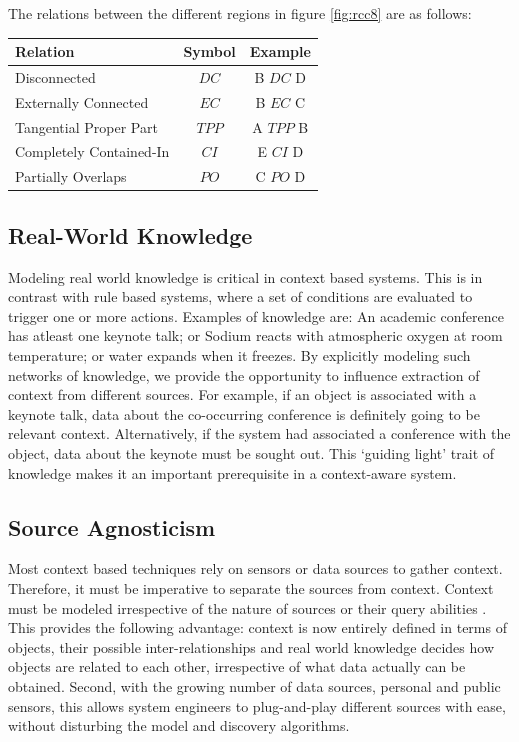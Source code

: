 The relations between the different regions in figure \ref{fig:rcc8} are as follows:
\begin{center}
    \begin{tabular}{ | l | c | c |}
    \hline
    \textbf{Relation} & \textbf{Symbol} & \textbf{Example} \\ \hline
    Disconnected & $DC$ & B $DC$ D \\ \hline
    Externally Connected & $EC$ & B $EC$ C \\ \hline
    Tangential Proper Part & $TPP$ & A $TPP$ B \\ \hline
    Completely Contained-In & $CI$ & E $CI$ D \\ \hline
    Partially Overlaps & $PO$ & C $PO$ D \\ \hline
    \end{tabular}
\end{center}

\subsection{Real-World Knowledge}
Modeling real world knowledge is critical in context based systems. This is in contrast with rule based systems, where a set of conditions are evaluated to trigger one or more actions. Examples of knowledge are: An academic conference has atleast one keynote talk; or Sodium reacts with atmospheric oxygen at room temperature; or water expands when it freezes. By explicitly modeling such networks of knowledge, we provide the opportunity to influence extraction of context from different sources. For example, if an object is associated with a keynote talk, data about the co-occurring conference is definitely going to be relevant context. Alternatively, if the system had associated a conference with the object, data about the keynote must be sought out. This `guiding light' trait of knowledge makes it an important prerequisite in a context-aware system.

\subsection{Source Agnosticism}
Most context based techniques rely on sensors or data sources to gather context. Therefore, it must be imperative to separate the sources from context. Context must be modeled irrespective of the nature of sources or their query abilities \cite{yerneni1999computing}. This provides the following advantage: context is now entirely defined in terms of objects, their possible inter-relationships and real world knowledge decides how objects are related to each other, irrespective of what data actually can be obtained. Second, with the growing number of data sources, personal and public sensors, this allows system engineers to plug-and-play different sources with ease, without disturbing the model and discovery algorithms.


